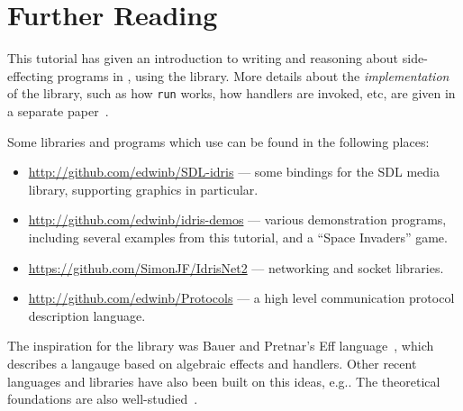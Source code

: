 \section{Further Reading}

\label{sect:further}

This tutorial has given an introduction to writing and reasoning about
side-effecting programs in \Idris{}, using the \effects{} library. More
details about the \emph{implementation} of the library, such as how
\texttt{run} works, how handlers are invoked, etc, are given in a
separate paper~\cite{brady-icfp2013}.

Some libraries and programs which use \effects{} can be found in the following
places:

\begin{itemize}
\item \url{http://github.com/edwinb/SDL-idris} --- some bindings for the SDL media
library, supporting graphics in particular.
\item \url{http://github.com/edwinb/idris-demos} --- various \Idris{} demonstration
programs, including several \effects{} examples from this tutorial, and
a ``Space Invaders'' game.
\item \url{https://github.com/SimonJF/IdrisNet2} --- networking and socket libraries.
\item \url{http://github.com/edwinb/Protocols} --- a high level communication
protocol description language.
\end{itemize}

The inspiration for the \effects{} library was Bauer and Pretnar's
Eff language~\cite{Bauer}, which describes a langauge based on algebraic
effects and handlers. Other recent languages and libraries have also been built
on this ideas, e.g.\cite{Lippmeier2009,handlers2013}. The theoretical
foundations are also
well-studied~\cite{Hyland2006,Levy2001,Plotkin2009,Pretnar2010}.

